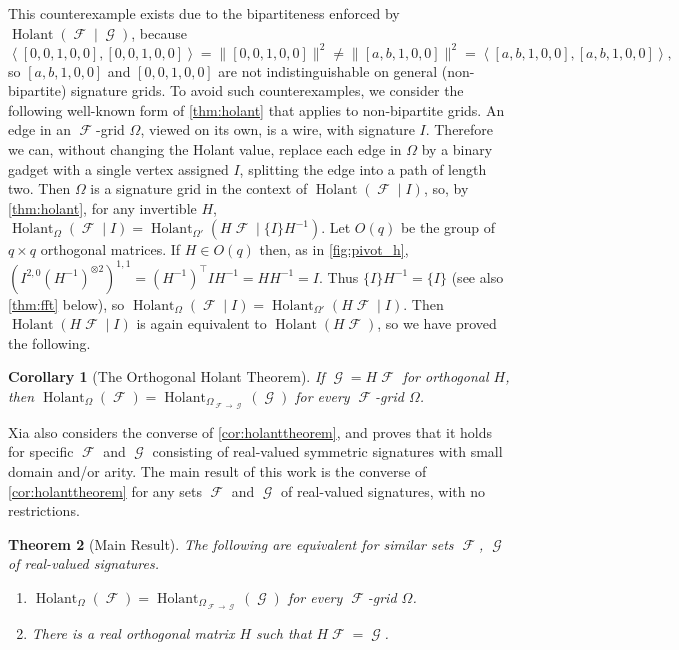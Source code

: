 \documentclass{article}
\newtheorem{theorem}{Theorem}\newtheorem{lemma}[theorem]{Lemma}\newtheorem{proposition}[theorem]{Proposition}\newtheorem{corollary}[theorem]{Corollary}\newtheorem{definition}[theorem]{Definition}\newtheorem{claim}[theorem]{Claim}\newtheorem{remark}[theorem]{Remark}\newtheorem{conjecture}[theorem]{Conjecture}
\DeclareMathOperator{\fc}{\mathcal{F}}
\DeclareMathOperator{\gc}{\mathcal{G}}
\DeclareMathOperator{\holant}{Holant}
\begin{document}
This counterexample exists due to 
the bipartiteness enforced by $\holant(\fc \mid \gc)$, because
\[
    \left\langle [0,0,1,0,0],[0,0,1,0,0]\right\rangle = \|[0,0,1,0,0]\|^2
    \neq \|[a,b,1,0,0]\|^2 = \left\langle [a,b,1,0,0],[a,b,1,0,0] \right\rangle,
\]
so $[a,b,1,0,0]$ and $[0,0,1,0,0]$ are not indistinguishable on
general (non-bipartite) signature grids. To avoid such counterexamples, we consider the
following well-known form of \autoref{thm:holant} that applies to non-bipartite grids.
An edge in an $\fc$-grid $\Omega$, viewed on its own, is a wire,
with signature $I$. Therefore we can, without changing the Holant value, replace each edge in 
$\Omega$ by a binary gadget with a single vertex assigned $I$, splitting the edge into a path
of length two. Then $\Omega$ is a signature grid in the context of
$\holant(\fc \mid I)$, so, by \autoref{thm:holant}, for any invertible $H$,
$\holant_\Omega(\fc \mid I) = \holant_{\Omega'}(H\fc \mid \{I\}H^{-1})$. 
Let $O(q)$ be the group of $q \times q$ orthogonal matrices.
If $H \in O(q)$ then, as in \autoref{fig:pivot_h}, $(I^{2,0} (H^{-1})^{\otimes 2})^{1,1}
= (H^{-1})^\top I H^{-1} = H H^{-1} = I$. Thus $\{I\} H^{-1} = \{I\}$ 
(see also \autoref{thm:fft} below), so
$\holant_\Omega(\fc \mid I) = \holant_{\Omega'}(H\fc \mid I)$. Then $\holant(H\fc \mid I)$
is again equivalent to $\holant(H\fc)$, so we have proved the following.
\begin{corollary}[The Orthogonal Holant Theorem]
    \label{cor:holanttheorem}
    If $\gc = H\fc$ for orthogonal $H$, then $\holant_\Omega(\fc) = \holant_{\Omega_{\fc\to\gc}}(\gc)$ for every $\fc$-grid $\Omega$.
\end{corollary}
Xia \cite{xia} also considers the converse of \autoref{cor:holanttheorem}, and proves that it holds
for specific $\fc$ and $\gc$ consisting of real-valued symmetric signatures with small domain
and/or arity.
The main result of this work is the converse of \autoref{cor:holanttheorem} for any
sets $\fc$ and $\gc$ of real-valued signatures, with no restrictions.

\begin{theorem}[Main Result]
    \label{thm:result}
    The following are equivalent for similar sets $\fc$, $\gc$ of real-valued signatures. 
    \begin{enumerate}[label=(\roman*)]
        \item $\holant_{\Omega}(\fc) = \holant_{\Omega_{\fc\to\gc}}(\gc)$
        for every $\fc$-grid $\Omega$.
        \item There is a real orthogonal matrix $H$ such that $H\fc = \gc$.
    \end{enumerate}
\end{theorem}
\end{document}
